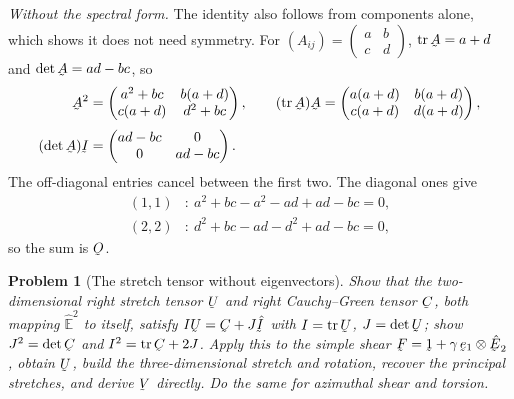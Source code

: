 \documentclass[17pt,a4paper]{extreport}
\DeclareRobustCommand{\vek}[1]{\underaccent{\tilde}{#1}}
\newcommand{\tr}{\operatorname{tr}}
\newcommand{\I}{\vek{I}}
\newcommand{\hI}{\hat{\vek{I}}}
\newcommand{\Ob}{\vek{O}}
\newcommand{\bA}{\vek{A}}
\newcommand{\bC}{\vek{C}}
\newcommand{\bF}{\vek{F}}
\newcommand{\bU}{\vek{U}}
\newcommand{\bV}{\vek{V}}
\newcommand{\be}{\vek{e}}
\newcommand{\hbE}{\hat{\vek{E}}}
\newcommand{\shift}{\vek{1}}
\theoremstyle{scplain}
\theoremstyle{scdefn}
\newtheorem{problem}{Problem}
\begin{document}
\emph{Without the spectral form.} The identity also follows from
components alone, which shows it does not need symmetry. For
$(A_{ij})=\left(\begin{smallmatrix}a&b\\ c&d\end{smallmatrix}\right)$,
$\tr\bA=a+d$ and $\det\bA=ad-bc$, so
\[
\begin{aligned}
   \bA^{2}&=\begin{pmatrix}a^{2}+bc&b(a+d)\\
      c(a+d)&d^{2}+bc\end{pmatrix},\qquad
   (\tr\bA)\bA=\begin{pmatrix}a(a+d)&b(a+d)\\
      c(a+d)&d(a+d)\end{pmatrix},\\[1mm]
   (\det\bA)\I&=\begin{pmatrix}ad-bc&0\\ 0&ad-bc\end{pmatrix}.
\end{aligned}
\]
The off-diagonal entries cancel between the first two. The diagonal ones
give
\[
\begin{aligned}
   (1,1)&:\ a^{2}+bc-a^{2}-ad+ad-bc=0,\\
   (2,2)&:\ d^{2}+bc-ad-d^{2}+ad-bc=0,
\end{aligned}
\]
so the sum is $\Ob$.

\begin{problem}[The stretch tensor without eigenvectors]
Show that the two-dimensional right stretch tensor $\bU$ and right
Cauchy--Green tensor $\bC$, both mapping $\hat{\mathbb{E}}^{2}$ to itself, satisfy
$I\bU=\bC+J\hI$ with $I=\tr\bU$, $J=\det\bU$; show $J^{2}=\det\bC$ and
$I^{2}=\tr\bC+2J$. Apply this to the simple shear
$\bF=\shift+\gamma\,\be_{1}\otimes\hbE_{2}$, obtain $\bU$, build the
three-dimensional stretch and rotation, recover the principal stretches,
and derive $\bV$ directly. Do the same for azimuthal shear and torsion.
\end{problem}
\end{document}
